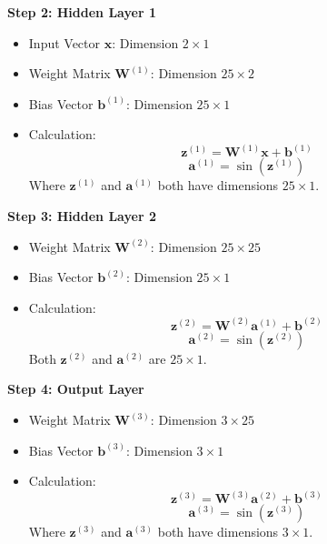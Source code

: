 \textbf{Step 2: Hidden Layer 1}
\begin{itemize}
  \item Input Vector $\mathbf{x}$: Dimension $2 \times 1$
  \item Weight Matrix $\mathbf{W}^{(1)}$: Dimension $25 \times 2$
  \item Bias Vector $\mathbf{b}^{(1)}$: Dimension $25 \times 1$
  \item Calculation:
  \begin{equation}
  \mathbf{z}^{(1)} = \mathbf{W}^{(1)} \mathbf{x} + \mathbf{b}^{(1)}
  \end{equation}
  \begin{equation}
  \mathbf{a}^{(1)} = \sin(\mathbf{z}^{(1)})
  \end{equation}
  Where $\mathbf{z}^{(1)}$ and $\mathbf{a}^{(1)}$ both have dimensions $25 \times 1$.
\end{itemize}

\textbf{Step 3: Hidden Layer 2}
\begin{itemize}
  \item Weight Matrix $\mathbf{W}^{(2)}$: Dimension $25 \times 25$
  \item Bias Vector $\mathbf{b}^{(2)}$: Dimension $25 \times 1$
  \item Calculation:
  \begin{equation}
  \mathbf{z}^{(2)} = \mathbf{W}^{(2)} \mathbf{a}^{(1)} + \mathbf{b}^{(2)}
  \end{equation}
  \begin{equation}
  \mathbf{a}^{(2)} = \sin(\mathbf{z}^{(2)})
  \end{equation}
  Both $\mathbf{z}^{(2)}$ and $\mathbf{a}^{(2)}$ are $25 \times 1$.
\end{itemize}

\textbf{Step 4: Output Layer}
\begin{itemize}
  \item Weight Matrix $\mathbf{W}^{(3)}$: Dimension $3 \times 25$
  \item Bias Vector $\mathbf{b}^{(3)}$: Dimension $3 \times 1$
  \item Calculation:
  \begin{equation}
  \mathbf{z}^{(3)} = \mathbf{W}^{(3)} \mathbf{a}^{(2)} + \mathbf{b}^{(3)}
  \end{equation}
  \begin{equation}
  \mathbf{a}^{(3)} = \sin(\mathbf{z}^{(3)})
  \end{equation}
  Where $\mathbf{z}^{(3)}$ and $\mathbf{a}^{(3)}$ both have dimensions $3 \times 1$.
\end{itemize}


